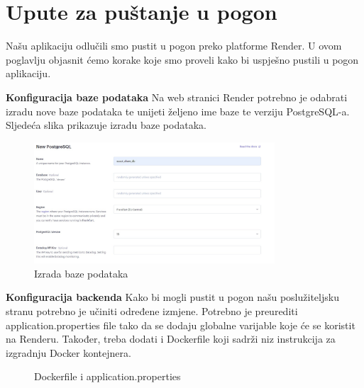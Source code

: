 			\eject 
		
		\section{Upute za puštanje u pogon}
		\indent Našu aplikaciju odlučili smo pustit u pogon preko platforme Render. U ovom poglavlju objasnit ćemo korake koje smo proveli kako bi uspješno pustili u pogon aplikaciju.\newline
	
		\textbf{Konfiguracija baze podataka}\newline
		Na web stranici Render potrebno je odabrati izradu nove baze podataka te unijeti željeno ime baze te verziju PostgreSQL-a. Sljedeća slika prikazuje izradu baze podataka.
		\begin{figure}[h]
			\centering
			\includegraphics[width=0.8\textwidth]{slike/pustanju_u_pogon_1.jpg}
			\caption{Izrada baze podataka}
			\label{fig:baza podataka}
		\end{figure}
		
		
		\textbf{Konfiguracija backenda}\newline
		Kako bi mogli pustit u pogon našu poslužiteljsku stranu potrebno je učiniti određene izmjene. Potrebno je preurediti application.properties file tako da se dodaju globalne varijable koje će se koristit na Renderu. Također, treba dodati i Dockerfile koji sadrži niz instrukcija za izgradnju Docker kontejnera. 
		
		\begin{figure}
			\centering
			\caption{Dockerfile i application.properties}
			\label{fig:dockerfile_application.properties}
		\end{figure}
		
